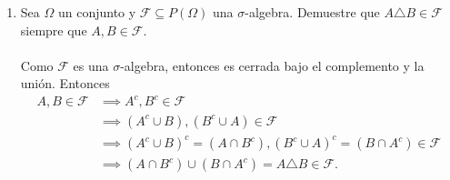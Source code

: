 \documentclass[12pt,a4paper]{report}
\begin{document}
\begin{enumerate}
{\begin{enumerate}[label=\alph*) ]
{		Sea $x \in (A_{1} \cup A_{2})\triangle (B_{1} \cup B_{2})
		= ((A_{1} \cup A_{2}) \cap (B_{1} \cup B_{2})^c) \cup ((B_{1} \cup B_{2}) \cap (A_{1} \cup A_{2})^c)$.\\
		Esto es, que $x \in (A_{1} \cup A_{2})$ o $x \in (B_{1} \cup B_{2})$,
		pero no los dos al mismo tiempo.\\
		Primero veamos que pasa si $x \in (A_{1} \cup A_{2})$.\\
		Entonces $x \notin (B_{1} \cup B_{2})$ y $x \in A_1$ o  $x \in A_2$.
		Sin perdidad de generalidad, digamos que $x \in A_1$. Entonces en particular
		$x \in (A_1 \cup B_1)$. Además, como $x \notin (B_{1} \cup B_{2})$,
		entonces tenemos que $x \notin B_1$ ni $x \notin B_2$, por lo que en particular
		$x \notin (B_1 \cap A_1)$. Entonces $x \in ((A_1 \cup B_1) \setminus (B_1 \cap A_1)) =
		(A_{1} \triangle B_{1})$.\\
		Analogamente, si $x \in A_2$, tenemos que $x \in (A_2 \triangle B_2)$.\\
		Luego, si $x \in (B_{1} \cup B_{2})$, entonces $x \notin (A_{1} \cup A_{2})$ y
		$x \in B_1$ o  $x \in B_2$.\\
		Como en el caso anterior, si $x \in B_1$, entonces $x \in (B_1 \cup A_1)$ y
		$x \notin (A_1 \cap B_1)$, por lo que $x \in A_{1} \triangle B_{1}$.\\
		Y analogamente, si $x \in B_2$, pasa que $x \in A_2 \triangle B_2$.\\
		Entonces, sin importar el elemento que tomemos de $(A_{1} \cup A_{2})\triangle (B_{1} \cup B_{2})$,
		éste está contenido en $(A_{1} \triangle B_{1}) \cup (A_{2} \triangle B_{2})$.\\
	}

	\item{
		Sea $\Omega$ un conjunto y $\mathcal{F} \subseteq P(\Omega)$ una $\sigma$-algebra.
		Demuestre que $A \triangle B \in \mathcal{F} $ siempre que $A,B \in \mathcal{F}$. \\\\
		Como $\mathcal{F}$ es una $\sigma$-algebra, entonces es cerrada bajo el complemento y la unión. Entonces
		\begin{align*}
			A,B \in \mathcal{F} &\implies A^c,B^c \in \mathcal{F}\\
													&\implies (A^c \cup B),(B^c \cup A) \in \mathcal{F}\\
													&\implies (A^c \cup B)^c = (A \cap B^c),(B^c \cup A)^c = (B \cap A^c) \in \mathcal{F}\\
													&\implies (A \cap B^c) \cup (B \cap A^c) = A \triangle B \in \mathcal{F}.
		\end{align*}

}
\end{enumerate}}
\end{enumerate}
\end{document}
